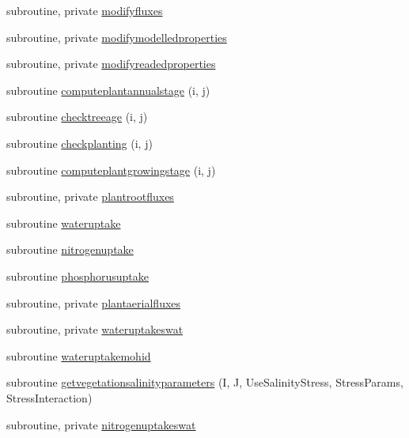 \begin{DoxyCompactItemize}
subroutine, private \mbox{\hyperlink{namespacemodulevegetation_aa3811c1a240a54342243a4e460197d77}{modifyfluxes}}
\item 
subroutine, private \mbox{\hyperlink{namespacemodulevegetation_a5532e866feccedcf7ef4094cb3f08064}{modifymodelledproperties}}
\item 
subroutine, private \mbox{\hyperlink{namespacemodulevegetation_a510092ab1c09ecfe1b683080ec88826a}{modifyreadedproperties}}
\item 
subroutine \mbox{\hyperlink{namespacemodulevegetation_aeb0bf58b2fe65989291c935b652a185e}{computeplantannualstage}} (i, j)
\item 
subroutine \mbox{\hyperlink{namespacemodulevegetation_adc2f366c1b31fc9c591f3d3be221f677}{checktreeage}} (i, j)
\item 
subroutine \mbox{\hyperlink{namespacemodulevegetation_a51a465c0efb7efd6bb8d99cabfc0c19e}{checkplanting}} (i, j)
\item 
subroutine \mbox{\hyperlink{namespacemodulevegetation_a57fef770d6b519b24b11d4ce771e5c20}{computeplantgrowingstage}} (i, j)
\item 
subroutine, private \mbox{\hyperlink{namespacemodulevegetation_abcc76339f35e9a70675847ad459a843c}{plantrootfluxes}}
\item 
subroutine \mbox{\hyperlink{namespacemodulevegetation_a8970a84682188f12c5a7e3c69fdbc853}{wateruptake}}
\item 
subroutine \mbox{\hyperlink{namespacemodulevegetation_a61c5cc19d5b5fe894bc935b7365563cb}{nitrogenuptake}}
\item 
subroutine \mbox{\hyperlink{namespacemodulevegetation_a8ecdc6f2c513a0f8920f448525858005}{phosphorusuptake}}
\item 
subroutine, private \mbox{\hyperlink{namespacemodulevegetation_a99cb73f235c051753d3cc48f59f56eae}{plantaerialfluxes}}
\item 
subroutine, private \mbox{\hyperlink{namespacemodulevegetation_abf633925bf9ba7db34dd3d63300fe43d}{wateruptakeswat}}
\item 
subroutine \mbox{\hyperlink{namespacemodulevegetation_ac76c877ab32f2ff96b234d3ba23b4dbc}{wateruptakemohid}}
\item 
subroutine \mbox{\hyperlink{namespacemodulevegetation_aede0fbef50c854f21b7dc76d3534b847}{getvegetationsalinityparameters}} (I, J, Use\+Salinity\+Stress, Stress\+Params, Stress\+Interaction)
\item 
subroutine, private \mbox{\hyperlink{namespacemodulevegetation_a5c30bda27fd79a69f45cc6fd35a2f0af}{nitrogenuptakeswat}}

\end{DoxyCompactItemize}
